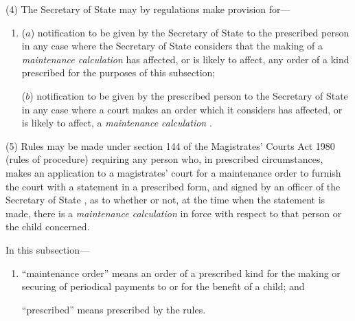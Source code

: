 \documentclass[12pt,a4paper]{article}
\begin{document}
(4) The Secretary of State may by regulations make provision for—
\begin{enumerate}\item[]
($a$) notification to be given by 
the 
Secretary of State  %
to the prescribed person in any case where 
the Secretary of State  %
considers that the making of a 
\emph{maintenance calculation}  %
has affected, or is likely to affect, any order of a kind prescribed for the purposes of this subsection;

($b$) notification to be given by the prescribed person to the 
Secretary of State  %
in any case where a court makes an order which it considers has affected, or is likely to affect, a 
\emph{maintenance calculation}%
.
\end{enumerate}

(5) Rules may be made under section 144 of the Magistrates' Courts Act 1980 (rules of procedure) requiring any person who, in prescribed circumstances, makes an application to a magistrates' court for a maintenance order to furnish the court with a statement in a prescribed form, and signed by 
an officer of the 
Secretary of State%
, as to whether or not, at the time when the statement is made, there is a 
\emph{maintenance calculation}  %
in force with respect to that person or the child concerned.

In this subsection—
\begin{enumerate}\item[]
    “maintenance order” means an order of a prescribed kind for the making or securing of periodical payments to or for the benefit of a child; and

    “prescribed” means prescribed by the rules. 
\end{enumerate}
\end{document}
